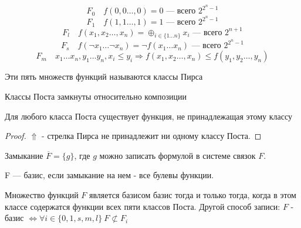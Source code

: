 $$F_0 \quad f(0,0\ldots,0)=0 \text{ --- всего } 2^{2^n-1}$$
$$F_1 \quad f(1,1\ldots,1)=1 \text{ --- всего } 2^{2^n-1}$$
$$F_l \quad f(x_1,x_2\ldots,x_n)=\oplus_{i\in\{1\ldots n\}} x_i \text{ --- всего } 2^{n+1}$$
$$F_s \quad f(\neg x_1\ldots \neg x_n)=\neg f(x_1\ldots x_n) \text{ --- всего } 2^{2^n-1}$$
$$F_m \quad x_1\ldots x_n, y_1\ldots y_n, x_i\leq y_i \Rightarrow f(x_1,x_2\ldots,x_n)
\leq f(y_1,y_2\ldots,y_n)$$

\begin{definition}
Эти пять множеств функций называются классы Пирса
\end{definition}

\begin{lemma}
Классы Поста замкнуты относительно композиции
\end{lemma}

\begin{lemma}
Для любого класса Поста существует функция, не принадлежащая этому классу
\end{lemma}

\begin{proof}
$\Uparrow$ - стрелка Пирса не принадлежит ни одному классу Поста.
\end{proof}

\begin{definition}
Замыкание $\overline{F}=\{g\}$, где $g$ можно записать формулой в системе связок $F$.
\end{definition}

\begin{definition}
F --- базис, если замыкание на нем - все булевы функции.
\end{definition}

\begin{theorem}
Множество функций $F$ является базисом базис тогда и только тогда, когда в этом классе
содержатся функции всех пяти классов Поста. Другой способ записи: $F$ - базис $\Leftrightarrow \forall
i\in\{0,1,s,m,l\} \ F\not\subset F_i$
\end{theorem}

